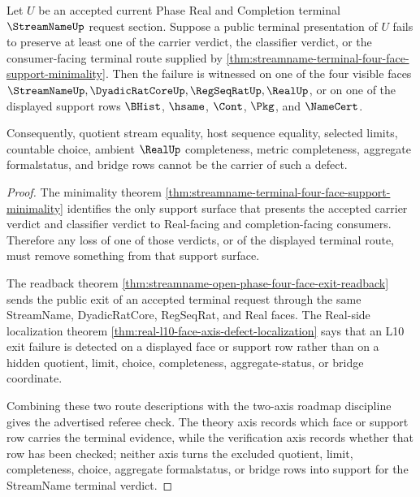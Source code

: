 \begin{theorem}
\label{thm:streamname-terminal-support-defect-localization}
Let $U$ be an accepted current Phase Real and Completion terminal
$\StreamNameUp$ request section. Suppose a public terminal presentation of
$U$ fails to preserve at least one of the carrier verdict, the classifier
verdict, or the consumer-facing terminal route supplied by
\autoref{thm:streamname-terminal-four-face-support-minimality}. Then the
failure is witnessed on one of the four visible faces
$\StreamNameUp,\DyadicRatCoreUp,\RegSeqRatUp,\RealUp$, or on one of the
displayed support rows $\BHist$, $\hsame$, $\Cont$, $\Pkg$, and
$\NameCert$.

Consequently, quotient stream equality, host sequence equality, selected
limits, countable choice, ambient $\RealUp$ completeness, metric completeness,
aggregate formalstatus, and bridge rows cannot be the carrier of such a
defect.
\end{theorem}
\begin{proof}
The minimality theorem
\autoref{thm:streamname-terminal-four-face-support-minimality} identifies the
only support surface that presents the accepted carrier verdict and classifier
verdict to Real-facing and completion-facing consumers. Therefore any loss of
one of those verdicts, or of the displayed terminal route, must remove
something from that support surface.

The readback theorem
\autoref{thm:streamname-open-phase-four-face-exit-readback} sends the public
exit of an accepted terminal request through the same StreamName,
DyadicRatCore, RegSeqRat, and Real faces. The Real-side localization theorem
\autoref{thm:real-l10-face-axis-defect-localization} says that an L10 exit
failure is detected on a displayed face or support row rather than on a hidden
quotient, limit, choice, completeness, aggregate-status, or bridge coordinate.

Combining these two route descriptions with the two-axis roadmap discipline
gives the advertised referee check. The theory axis records which face or
support row carries the terminal evidence, while the verification axis records
whether that row has been checked; neither axis turns the excluded quotient,
limit, completeness, choice, aggregate formalstatus, or bridge rows into
support for the StreamName terminal verdict.
\end{proof}

